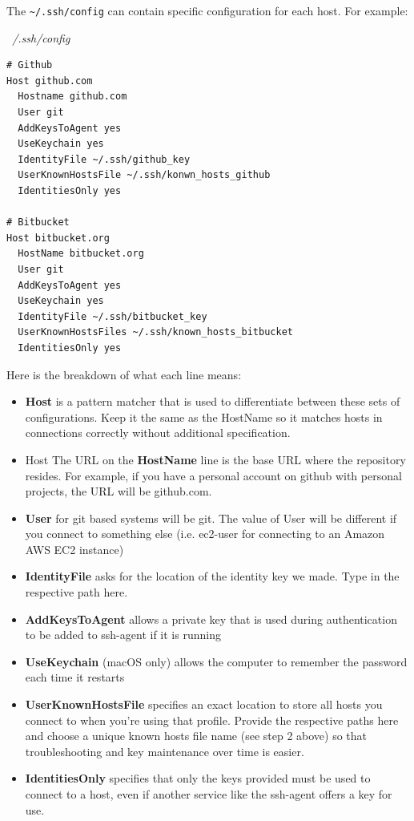 \documentclass{article}
\newenvironment{codetemplate}[1][]{%
  \mybasecolorbox[#1]
  \itshape
}{%
  \endmybasecolorbox
}
\begin{document}
The \verb+~/.ssh/config+ can contain specific configuration for each host. For example:

\begin{codetemplate}{~/.ssh/config}
\begin{verbatim}
# Github
Host github.com
  Hostname github.com
  User git
  AddKeysToAgent yes
  UseKeychain yes
  IdentityFile ~/.ssh/github_key
  UserKnownHostsFile ~/.ssh/konwn_hosts_github
  IdentitiesOnly yes

# Bitbucket
Host bitbucket.org
  HostName bitbucket.org
  User git
  AddKeysToAgent yes
  UseKeychain yes
  IdentityFile ~/.ssh/bitbucket_key
  UserKnownHostsFiles ~/.ssh/known_hosts_bitbucket
  IdentitiesOnly yes
\end{verbatim}
\end{codetemplate}

Here is the breakdown of what each line means:

\begin{itemize}
    \item \textbf{Host} is a pattern matcher that is used to differentiate between these sets of configurations. Keep it the same as the HostName so it matches hosts in connections correctly without additional specification.
    \item Host The URL on the \textbf{HostName} line is the base URL where the repository resides. For example, if you have a personal account on github with personal projects, the URL will be github.com.
    \item \textbf{User} for git based systems will be git. The value of User will be different if you connect to something else (i.e. ec2-user for connecting to an Amazon AWS EC2 instance)
    \item \textbf{IdentityFile} asks for the location of the identity key we made. Type in the respective path here.
    \item \textbf{AddKeysToAgent} allows a private key that is used during authentication to be added to ssh-agent if it is running
    \item \textbf{UseKeychain} (macOS only) allows the computer to remember the password each time it restarts
    \item \textbf{UserKnownHostsFile} specifies an exact location to store all hosts you connect to when you're using that profile. Provide the respective paths here and choose a unique known hosts file name (see step 2 above) so that troubleshooting and key maintenance over time is easier.
    \item \textbf{IdentitiesOnly} specifies that only the keys provided must be used to connect to a host, even if another service like the ssh-agent offers a key for use.
\end{itemize}
\end{document}
